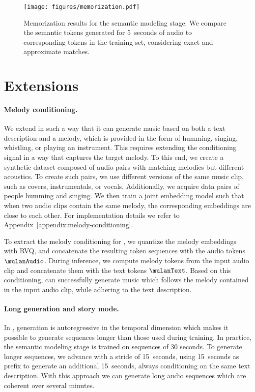 \begin{figure}[t]
\begin{center}
    \centerline{\texttt{[image: figures/memorization.pdf]}}
    \vspace{-2mm}
    \caption{Memorization results for the semantic modeling stage. We compare the semantic tokens generated for 5~seconds of audio to corresponding tokens in the training set, considering exact and approximate matches.}
    \label{fig:memorization}
    \vspace{-6mm}
\end{center}
\end{figure}



\section{Extensions}
\paragraph{Melody conditioning.}
\label{melody-conditioning}
We extend {\model} in such a way that it can generate music based on both a text description and a melody, which is provided in the form of humming, singing, whistling, or playing an instrument. 
This requires extending the conditioning signal in a way that captures the target melody. To this end, we create a synthetic dataset composed of audio pairs with matching melodies but different acoustics. To create such pairs, we use different versions of the same music clip, such as covers, instrumentals, or vocals. Additionally, we acquire data pairs of people humming and singing. We then train a joint embedding model such that when two audio clips contain the same melody, the corresponding embeddings are close to each other. For implementation details we refer to Appendix~\ref{appendix:melody-conditioning}. 

To extract the melody conditioning for {\model}, we quantize the melody embeddings with RVQ, and concatenate the resulting token sequences with the {\mulan} audio tokens $\mulanAudio$.
During inference, we compute melody tokens from the input audio clip and concatenate them with the {\mulan} text tokens $\mulanText$.
Based on this conditioning, {\model} can successfully generate music which follows the melody contained in the input audio clip, while adhering to the text description.

\paragraph{Long generation and story mode.}
\label{story-mode}
In {\model}, generation is autoregressive in the temporal dimension which makes it possible to generate sequences longer than those used during training. In practice, the semantic modeling stage is trained on sequences of 30 seconds. To generate longer sequences, we advance with a stride of 15~seconds, using 15~seconds as prefix to generate an additional 15~seconds, always conditioning on the same text description. With this approach we can generate long audio sequences which are coherent over several minutes.

